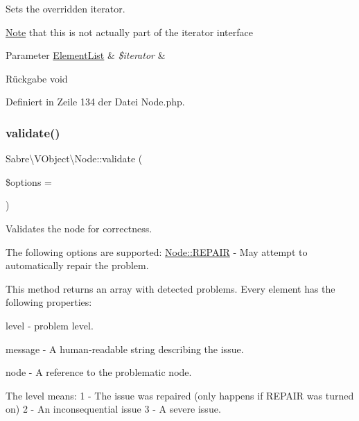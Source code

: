 Sets the overridden iterator.

\mbox{\hyperlink{class_note}{Note}} that this is not actually part of the iterator interface


\begin{DoxyParams}[1]{Parameter}
\mbox{\hyperlink{class_sabre_1_1_v_object_1_1_element_list}{Element\+List}} & {\em \$iterator} & \\
\hline
\end{DoxyParams}
\begin{DoxyReturn}{Rückgabe}
void 
\end{DoxyReturn}


Definiert in Zeile 134 der Datei Node.\+php.

\mbox{\label{class_sabre_1_1_v_object_1_1_node_af9c38fcb5a0bc73f4d4fe39663a4abdd}} 
\subsubsection{\texorpdfstring{validate()}{validate()}}
{\footnotesize\ttfamily Sabre\textbackslash{}\+V\+Object\textbackslash{}\+Node\+::validate (\begin{DoxyParamCaption}\item[{}]{\$options = {} }\end{DoxyParamCaption})}

Validates the node for correctness.

The following options are supported\+: \mbox{\hyperlink{class_sabre_1_1_v_object_1_1_node_ac97a7fb85c1f871523336cd1ec6b29a9}{Node\+::\+R\+E\+P\+A\+IR}} -\/ May attempt to automatically repair the problem.

This method returns an array with detected problems. Every element has the following properties\+:


\begin{DoxyItemize}
\item level -\/ problem level.
\item message -\/ A human-\/readable string describing the issue.
\item node -\/ A reference to the problematic node.
\end{DoxyItemize}

The level means\+: 1 -\/ The issue was repaired (only happens if R\+E\+P\+A\+IR was turned on) 2 -\/ An inconsequential issue 3 -\/ A severe issue.


